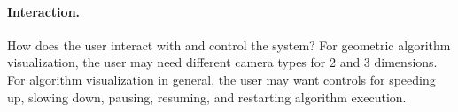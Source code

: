 
\paragraph{Interaction.} How does the user interact with and control the system?
For geometric algorithm visualization, the user may need different camera types
for 2 and 3 dimensions. For algorithm visualization in general, the user may
want controls for speeding up, slowing down, pausing, resuming, and restarting
algorithm execution.

